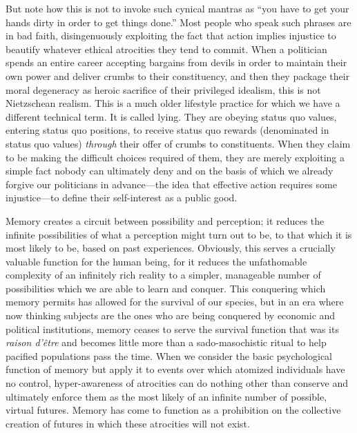 \documentclass[a4paper,12pt,margin=.5in]{article}
\begin{document}
But note how this is not to invoke such cynical mantras as ``you have to
get your hands dirty in order to get things done.'' Most people who
speak such phrases are in bad faith, disingenuously exploiting the fact
that action implies injustice to beautify whatever ethical atrocities
they tend to commit. When a politician spends an entire career accepting
bargains from devils in order to maintain their own power and deliver
crumbs to their constituency, and then they package their moral
degeneracy as heroic sacrifice of their privileged idealism, this is not
Nietzschean realism. This is a much older lifestyle practice for which
we have a different technical term. It is called lying. They are obeying
status quo values, entering status quo positions, to receive status quo
rewards (denominated in status quo values) \emph{through} their offer of
crumbs to constituents. When they claim to be making the difficult
choices required of them, they are merely exploiting a simple fact
nobody can ultimately deny and on the basis of which we already forgive
our politicians in advance---the idea that effective action requires
some injustice---to define their self-interest as a public good.

Memory creates a circuit between possibility and perception; it reduces
the infinite possibilities of what a perception might turn out to be, to
that which it is most likely to be, based on past experiences.
Obviously, this serves a crucially valuable function for the human
being, for it reduces the unfathomable complexity of an infinitely rich
reality to a simpler, manageable number of possibilities which we are
able to learn and conquer. This conquering which memory permits has
allowed for the survival of our species, but in an era where now
thinking subjects are the ones who are being conquered by economic and
political institutions, memory ceases to serve the survival function
that was its \emph{raison d'être} and becomes little more than a
sado-masochistic ritual to help pacified populations pass the time. When
we consider the basic psychological function of memory but apply it to
events over which atomized individuals have no control, hyper-awareness
of atrocities can do nothing other than conserve and ultimately enforce
them as the most likely of an infinite number of possible, virtual
futures. Memory has come to function as a prohibition on the collective
creation of futures in which these atrocities will not exist.
\end{document}
